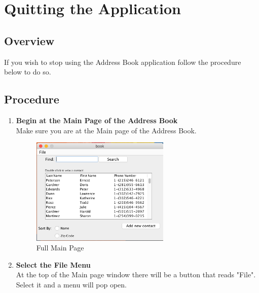 \documentclass[a4paper, 11pt]{article}
\begin{document}
\clearpage

\section{Quitting the Application}
\subsection{Overview}
If you wish to stop using the Address Book application follow the procedure below to do so. 
\subsection{Procedure}
\begin{enumerate}[label=\textbf{\arabic*})]
    \item{\textbf{Begin at the Main Page of the Address Book}}\\ Make sure you are at the Main page of the Address Book.
    
    \begin{figure}[h!]
    \centering
      \includegraphics[width=250]{main_page_full.png}
      \caption{Full Main Page}
    \end{figure}
    
    \item{\textbf{Select the File Menu}}\\ At the top of the Main page window there will be a button that reads "File". Select it and a menu will pop open.
    

\end{enumerate}
\end{document}
